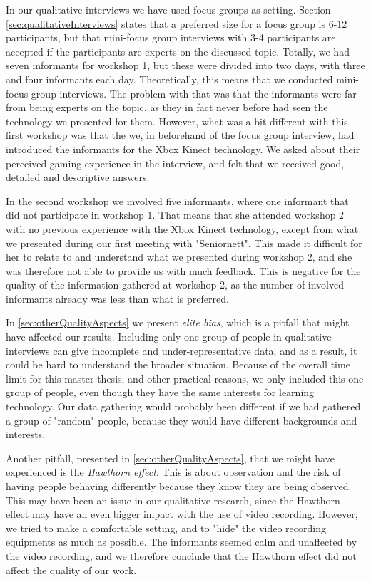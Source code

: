 In our qualitative interviews we have used focus groups as setting. Section \ref{sec:qualitativeInterviews} states that a preferred size for a focus group is 6-12 participants, but that mini-focus group interviews with 3-4 participants are accepted if the participants are experts on the discussed topic. Totally, we had seven informants for workshop 1, but these were divided into two days, with three and four informants each day. Theoretically, this means that we conducted mini-focus group interviews. The problem with that was that the informants were far from being experts on the topic, as they in fact never before had seen the technology we presented for them. However, what was a bit different with this first workshop was that the we, in beforehand of the focus group interview, had introduced the informants for the Xbox Kinect technology. We asked about their perceived gaming experience in the interview, and felt that we received good, detailed and descriptive answers. 

In the second workshop we involved five informants, where one informant that did not participate in workshop 1. That means that she attended workshop 2 with no previous experience with the Xbox Kinect technology, except from what we presented during our first meeting with "Seniornett". This made it difficult for her to relate to and understand what we presented during workshop 2, and she was therefore not able to provide us with much feedback. This is negative for the quality of the information gathered at workshop 2, as the number of involved informants already was less than what is preferred. 

In \ref{sec:otherQualityAspects} we present \emph{elite bias}, which is a pitfall that might have affected our results. Including only one group of people in qualitative interviews can give incomplete and under-representative data, and as a result, it could be hard to understand the broader situation. Because of the overall time limit for this master thesis, and other practical reasons, we only included this one group of people, even though they have the same interests for learning technology. Our data gathering would probably been different if we had gathered a group of "random" people, because they would have different backgrounds and interests.

Another pitfall, presented in \ref{sec:otherQualityAspects}, that we might have experienced  is the \emph{Hawthorn effect}. This is about observation and the risk of having people behaving differently because they know they are being observed. This may have been an issue in our qualitative research, since the Hawthorn effect may have an even bigger impact with the use of video recording. However, we tried to make a comfortable setting, and to "hide" the video recording equipments as much as possible. The informants seemed calm and unaffected by the video recording, and we therefore conclude that the Hawthorn effect did not affect the quality of our work. 

